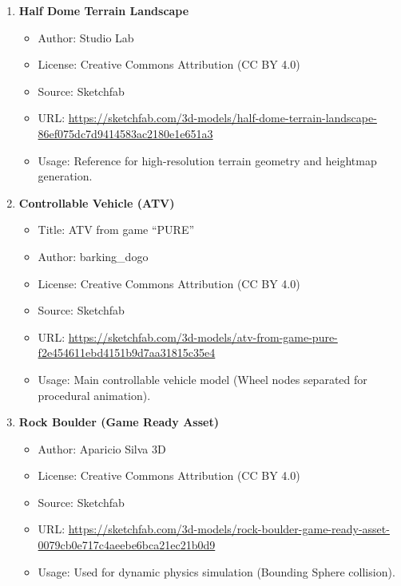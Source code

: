 \documentclass[11pt,a4paper]{article}
\begin{document}
\begin{enumerate}
  \item \textbf{Half Dome Terrain Landscape}
    \begin{itemize}\setlength\itemsep{2pt}\setlength\parskip{0pt}
      \item Author: Studio Lab
      \item License: Creative Commons Attribution (CC BY 4.0)
      \item Source: Sketchfab
      \item URL: \url{https://sketchfab.com/3d-models/half-dome-terrain-landscape-86ef075dc7d9414583ac2180e1e651a3}
      \item Usage: Reference for high-resolution terrain geometry and heightmap generation.
    \end{itemize}

  \item \textbf{Controllable Vehicle (ATV)}
    \begin{itemize}\setlength\itemsep{2pt}\setlength\parskip{0pt}
      \item Title: ATV from game ``PURE''
      \item Author: barking\_dogo
      \item License: Creative Commons Attribution (CC BY 4.0)
      \item Source: Sketchfab
      \item URL: \url{https://sketchfab.com/3d-models/atv-from-game-pure-f2e454611ebd4151b9d7aa31815c35e4}
      \item Usage: Main controllable vehicle model (Wheel nodes separated for procedural animation).
    \end{itemize}

  \item \textbf{Rock Boulder (Game Ready Asset)}
    \begin{itemize}\setlength\itemsep{2pt}\setlength\parskip{0pt}
      \item Author: Aparicio Silva 3D
      \item License: Creative Commons Attribution (CC BY 4.0)
      \item Source: Sketchfab
      \item URL: \url{https://sketchfab.com/3d-models/rock-boulder-game-ready-asset-0079cb0e717c4aeebe6bca21ec21b0d9}
      \item Usage: Used for dynamic physics simulation (Bounding Sphere collision).
    \end{itemize}


\end{enumerate}
\end{document}

